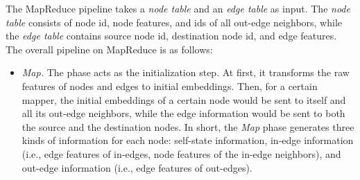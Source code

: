 \documentclass[conference]{IEEEtran}
\begin{document}
The MapReduce pipeline takes a \emph{node table} and an \emph{edge table} as input.
The \emph{node table}  consists of node id, node features, and ids of all out-edge neighbors, while the \emph{edge table} contains source node id, destination node id, and edge features.  
The overall pipeline on MapReduce is as follows:
\begin{itemize}
\item \emph{Map.}
The phase acts as the initialization step.
At first, it transforms the raw features of nodes and edges to initial embeddings.
Then, for a certain mapper, the initial embeddings of a certain node would be sent to itself and all its out-edge neighbors, while the edge information would be sent to both the source and the destination nodes.
In short, the \emph{Map} phase generates three kinds of information for each node: self-state information, in-edge information (i.e., edge features of in-edges, node features of the in-edge neighbors), and out-edge information (i.e., edge features of out-edges).


\end{itemize}
\end{document}
